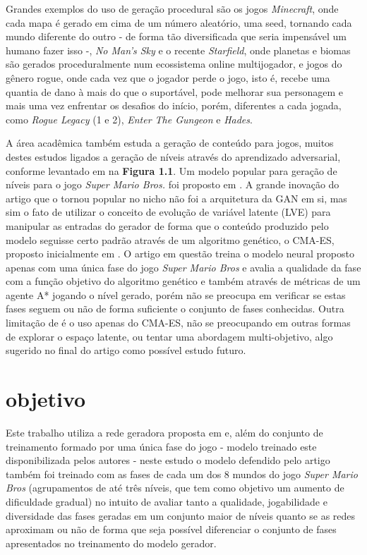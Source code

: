Grandes exemplos do uso de geração procedural são os jogos \textit{Minecraft}, onde cada mapa é gerado em cima de um número aleatório, uma seed, tornando cada mundo diferente do outro - de forma tão diversificada que seria impensável um humano fazer isso -, \textit{No Man’s Sky} e o recente \textit{Starfield}, onde planetas e biomas são gerados proceduralmente num ecossistema online multijogador, e jogos do gênero rogue, onde cada vez que o jogador perde o jogo, isto é, recebe uma quantia de dano à mais do que o suportável, pode melhorar sua personagem e mais uma vez enfrentar os desafios do início, porém, diferentes a cada jogada, como \textit{Rogue Legacy} (1 e 2), \textit{Enter The Gungeon} e \textit{Hades}.  

A área acadêmica também estuda a geração de conteúdo para jogos, muitos destes estudos ligados a geração de níveis através do aprendizado adversarial, conforme levantado em \cite{survey2020} na \textbf{Figura 1.1}. Um modelo popular para geração de níveis para o jogo \textit{Super Mario Bros.} foi proposto em \cite{marioGAN}. A grande inovação do artigo que o tornou popular no nicho não foi a arquitetura da GAN em si, mas sim o fato de utilizar o conceito de evolução de variável latente (LVE) para manipular as entradas do gerador de forma que o conteúdo produzido pelo modelo seguisse certo padrão através de um algoritmo genético, o CMA-ES, proposto inicialmente em \cite{cma-es}. O artigo em questão treina o modelo neural proposto apenas com uma única fase do jogo \textit{Super Mario Bros} e avalia a qualidade da fase com a função objetivo do algoritmo genético e também através de métricas de um agente A* jogando o nível gerado, porém não se preocupa em verificar se estas fases seguem ou não de forma suficiente o conjunto de fases conhecidas. Outra limitação de \cite{marioGAN} é o uso apenas do CMA-ES, não se preocupando em outras formas de explorar o espaço latente, ou tentar uma abordagem multi-objetivo, algo sugerido no final do artigo como possível estudo futuro. 

\section{objetivo}

Este trabalho utiliza a rede geradora proposta em \cite{marioGAN} e, além do conjunto de treinamento formado por uma única fase do jogo - modelo treinado este disponibilizada pelos autores - neste estudo o modelo defendido pelo artigo também foi treinado com as fases de cada um dos 8 mundos do jogo \textit{Super Mario Bros} (agrupamentos de até três níveis, que tem como objetivo um aumento de dificuldade gradual) no intuito de avaliar tanto a qualidade, jogabilidade e diversidade das fases geradas em um conjunto maior de níveis quanto se as redes aproximam ou não de forma que seja possível diferenciar o conjunto de fases apresentados no treinamento do modelo gerador.

